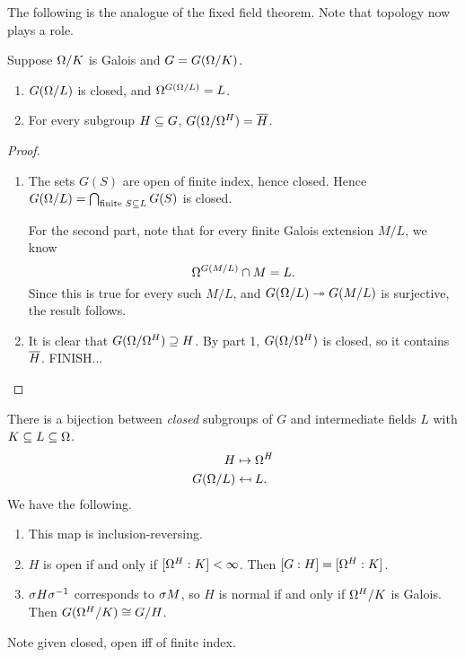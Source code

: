 The following is the analogue of the fixed field theorem. Note that topology now plays a role.
\begin{thm}
Suppose $\Omega/K$ is Galois and $G=G(\Omega/K)$.
\begin{enumerate}
\item
$G(\Omega/L)$ is closed, and $\Omega^{G(\Omega/L)}=L$.
\item
For every subgroup $H\subseteq G$, $G(\Omega/\Omega^H)=\overline{H}$.
\end{enumerate}
\begin{proof}
\begin{enumerate}
\item %
The sets $G(S)$ are open of finite index, hence closed.
Hence $G(\Omega/L)=\bigcap_{\text{finite }S\subseteq L} G(S)$ is closed.

For the second part, 
note that for every finite Galois extension $M/L$, we know
\[
\Omega^{G(M/L)}\cap M=L.
\]
Since this is true for every such $M/L$, and $G(\Omega/L)\twoheadrightarrow G(M/L)$ is surjective, the result follows.
\item It is clear that $G(\Omega/\Omega^H)\supseteq H$. 
By part 1, $G(\Omega/\Omega^H)$ is closed, so it contains $\overline{H}$.  FINISH...
\end{enumerate}
\end{proof}
\begin{thm}\label{ftogt-infinite}
There is a bijection between {\it closed} subgroups of $G$ and intermediate fields $L$ with $K\subseteq L\subseteq \Omega$.
\begin{align*}
H&\mapsto \Omega^H\\
G(\Omega/L)&\mapsfrom L.
\end{align*}
We have the following.
\begin{enumerate}
\item
This map is inclusion-reversing.
\item
$H$ is open if and only if $[\Omega^H:K]<\infty$. Then $[G:H]=[\Omega^H:K]$.
\item $\sigma H\sigma^{-1}$ corresponds to $\sigma M$, so $H$ is normal if and only if $\Omega^H/K$ is Galois. Then $G(\Omega^H/K)\cong G/H$.
\end{enumerate}
\end{thm}
Note given closed, open iff of finite index.
\end{thm}
